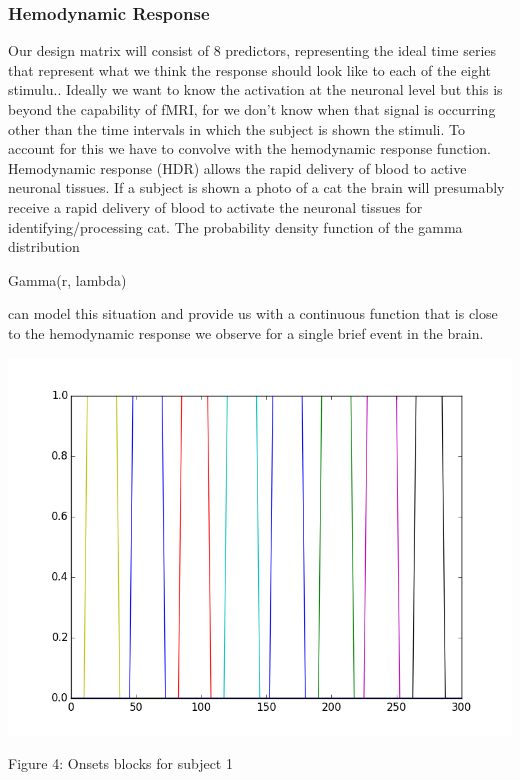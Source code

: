 \documentclass[12pt]{article}
\begin{document}
\subsubsection{Hemodynamic Response}

Our design matrix will consist of 8 predictors, representing the ideal time series 
that represent what we think the response should look like to each of the eight 
stimulu.. Ideally we want to know the activation at the neuronal level but 
this is beyond the capability of fMRI, for we don’t know when that signal 
is occurring other than the time intervals in which the subject is shown the 
stimuli. To account for this we have to convolve with the hemodynamic response 
function. Hemodynamic response (HDR) allows the rapid delivery of blood to 
active neuronal tissues. If a subject is shown a photo of a cat the brain will 
presumably receive a rapid delivery of blood to activate the neuronal tissues 
for identifying/processing cat. The probability density function of the gamma 
distribution
  
           Gamma(r, lambda)

can model this situation and provide us with a continuous function that is 
close to the hemodynamic response we observe for a single brief event in the 
brain.

\begin{housevseverything}
    \centering
      \includegraphics[width=1\textwidth]{block}
    \caption{Figure 4: Onsets blocks for subject 1}
\end{housevseverything}
\end{document}
